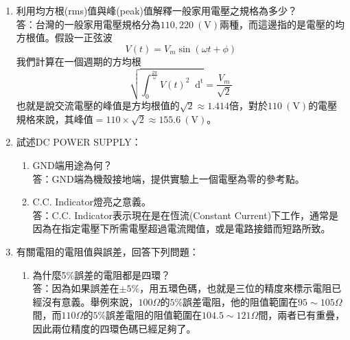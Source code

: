 \documentclass[12pt, a4paper]{article}
\def\large{\fontsize{14}{21}\selectfont}
\newcommand{\unit}[1]{\:(\text{#1})}
\newcommand{\df}[1]{\mathop{}\!\mathrm{d^#1}}
\begin{document}
\begin{enumerate}[itemsep=20pt, topsep=10pt]
	\item {\large 利用均方根(rms)值與峰(peak)值解釋一般家用電壓之規格為多少？} \\[10pt]
		答：台灣的一般家用電壓規格分為$110,220 \unit{V}$兩種，而這邊指的是電壓的均方根值。假設一正弦波
		\[ V(t) = V_m \sin(\omega t + \phi) \]
		我們計算在一個週期的方均根
		\[ \sqrt{ \int_{0}^{\frac{2 \pi}{\omega}} V(t)^2 \df t } = \frac{V_m}{\sqrt{2}} \]
		也就是說交流電壓的峰值是方均根值的$\sqrt{2} \approx 1.414$倍，對於$110 \unit{V}$的電壓規格來說，其峰值$=110 \times  \sqrt{2} \approx 155.6 \unit{V}$。

	\item {\large 試述DC POWER SUPPLY：}
		\begin{enumerate}[label=(\alph*)]
			\item {\large GND端用途為何？} \\[5pt]
			答：GND端為機殼接地端，提供實驗上一個電壓為零的參考點。
			\item {\large C.C. Indicator燈亮之意義。}\\[5pt]
				答：C.C. Indicator表示現在是在恆流(Constant Current)下工作，通常是因為在指定電壓下所需電壓超過電流閥值，或是電路接錯而短路所致。
		\end{enumerate}

	\item {\large 有關電阻的電阻值與誤差，回答下列問題：}
		\begin{enumerate}[label=(\alph*)]
			\item {\large 為什麼5\%誤差的電阻都是四環？}\\[5pt]
			答：因為如果誤差在$\pm 5\%$，用五環色碼，也就是三位的精度來標示電阻已經沒有意義。舉例來說，$100 \Omega$的$5 \%$誤差電阻，他的阻值範圍在$95 \sim 105 \Omega$間，而$110 \Omega$的$5 \%$誤差電阻的阻值範圍在$104.5 \sim 121 \Omega$間，兩者已有重疊，因此兩位精度的四環色碼已經足夠了。


\end{enumerate}
\end{enumerate}
\end{document}
